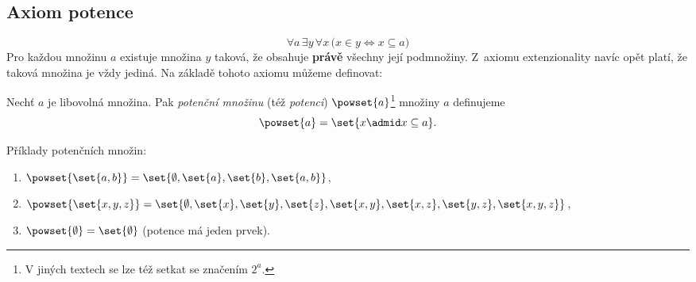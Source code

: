 \subsection{Axiom potence}
\begin{equation*}
    \forall a\,\exists y\,\forall x\,\bigl(x\in y \iff x\subseteq a\bigr)
\end{equation*}
Pro každou množinu $a$ existuje množina $y$ taková, že obsahuje \textbf{právě} všechny její podmnožiny. Z~axiomu extenzionality navíc opět platí, že taková množina je vždy jediná. Na základě tohoto axiomu můžeme definovat:
\begin{definition}
    Nechť $a$ je libovolná množina. Pak \emph{potenční množinu} (též \emph{potenci}) $\powset{a}$\footnote{V jiných textech se lze též setkat se značením $2^a$.} množiny $a$ definujeme
    \begin{equation*}
        \powset{a}=\set{x \admid x\subseteq a}.
    \end{equation*}
\end{definition}
\begin{example}\label{ex:potence}
    Příklady potenčních množin:
    \begin{enumerate}[label=(\roman*)]
        \item $\powset{\set{a,b}}=\set{\emptyset,\set{a},\set{b},\set{a,b}}$,
        \item $\powset{\set{x,y,z}}=\set{\emptyset,\set{x},\set{y},\set{z},\set{x,y},\set{x,z},\set{y,z},\set{x,y,z}}$,
        \item $\powset{\emptyset}=\set{\emptyset}$ (potence má jeden prvek).
    \end{enumerate}
\end{example}

